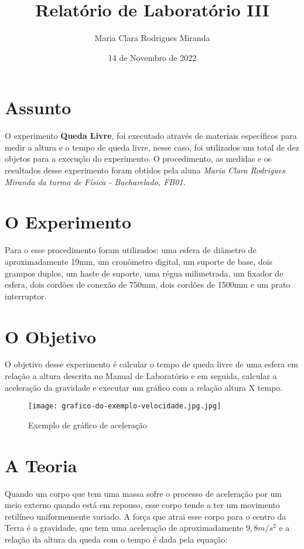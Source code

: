 \documentclass[a4paper, 12pt]{article}
\title{Relatório de Laboratório III}
\author{Maria Clara Rodrigues Miranda}
\date{14 de Novembro de 2022}
\begin{document}
\maketitle

\section{Assunto}
O experimento \textbf{Queda Livre}, foi executado através de materiais específicos para medir a altura e o tempo de queda livre, nesse caso, foi utilizados um total de dez objetos para a execução do experimento. O procedimento, as medidas e os resultados desse experimento foram obtidos pela aluna \textit{Maria Clara Rodrigues Miranda da turma de Física - Bacharelado, FB01.}

\section{O Experimento}
Para o esse procedimento foram utilizados: uma esfera de diâmetro de aproximadamente 19mm, um cronômetro digital, um suporte de base, dois grampos duplos, um haste de suporte, uma régua milimetrada, um fixador de esfera, dois cordões de conexão de 750mm, dois cordões de 1500mm e um prato interruptor.

\section{O Objetivo}
O objetivo desse experimento é calcular o tempo de queda livre de uma esfera em relação a altura descrita no Manual de Laboratório e em seguida, calcular a aceleração da gravidade e executar um gráfico com a relação altura X tempo.

\begin{figure}[ht]
\centering 
\texttt{[image: grafico-do-exemplo-velocidade.jpg.jpg]} 
\caption{Exemplo de gráfico de aceleração} 
\label{Fig01} 
\end{figure}

\section{A Teoria}
Quando um corpo que tem uma massa sofre o processo de aceleração por um meio externo quando está em repouso, esse corpo tende a ter um movimento retilíneo uniformemente variado. A força que atrai esse corpo para o centro da Terra é a gravidade, que tem uma aceleração de aproximadamente $9,8m/s^{2}$ e a relação da altura da queda com o tempo é dada pela equação:
\end{document}
